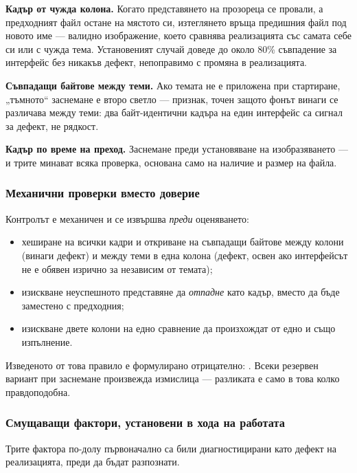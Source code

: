 \textbf{Кадър от чужда колона.} Когато представянето на прозореца се провали, а
предходният файл остане на мястото си, изтеглянето връща предишния файл под новото
име --- валидно изображение, което сравнява реализацията със самата себе си или с
чужда тема. Установеният случай доведе до около 80\% съвпадение за интерфейс без
никакъв дефект, непоправимо с промяна в реализацията.

\textbf{Съвпадащи байтове между теми.} Ако темата не е приложена при стартиране,
„тъмното“ заснемане е второ светло --- признак, точен защото фонът винаги се различава
между теми: два байт-идентични кадъра на един интерфейс са сигнал за дефект, не
рядкост.

\textbf{Кадър по време на преход.} Заснемане преди установяване на изобразяването ---
и трите минават всяка проверка, основана само на наличие и размер на файла.

\subsubsection{Механични проверки вместо доверие}

Контролът е механичен и се извършва \emph{преди} оценяването:

\begin{itemize}[topsep=2pt,itemsep=1pt,leftmargin=*]
\item хеширане на всички кадри и откриване на съвпадащи байтове между колони (винаги
      дефект) и между теми в една колона (дефект, освен ако интерфейсът не е обявен
      изрично за независим от темата);
\item изискване неуспешното представяне да \emph{отпадне} като кадър, вместо да бъде
      заместено с предходния;
\item изискване двете колони на едно сравнение да произхождат от едно и също
      изпълнение.
\end{itemize}

Изведеното от това правило е формулирано отрицателно: . Всеки резервен вариант при заснемане произвежда измислица
--- разликата е само в това колко правдоподобна.

\subsubsection{Смущаващи фактори, установени в хода на работата}

Трите фактора по-долу първоначално са били диагностицирани като дефект на
реализацията, преди да бъдат разпознати.

